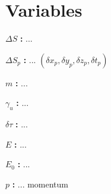 \section{Variables}

\noindent ${\Delta S}$ \textbf{:}
...

\noindent ${\Delta S_p}$ \textbf{:}
... $({\delta x_p},{\delta y_p},{\delta z_p},{\delta t_p})$

\noindent ${m}$ \textbf{:}
...

\noindent ${\gamma_u}$ \textbf{:}
...

\noindent ${\delta \tau}$ \textbf{:}
...

\noindent ${E}$ \textbf{:}
...

\noindent ${E_0}$ \textbf{:}
...

\noindent ${p}$ \textbf{:}
... momentum
